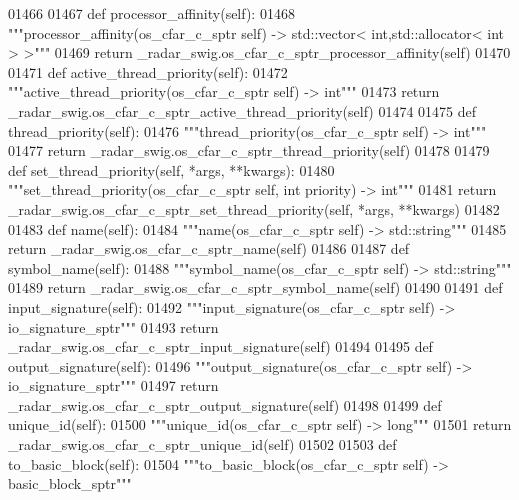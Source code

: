 \begin{DoxyCode}
{{{{{{01466 
01467     \textcolor{keyword}{def }processor_affinity(self):
01468         \textcolor{stringliteral}{"""processor\_affinity(os\_cfar\_c\_sptr self) -> std::vector< int,std::allocator< int > >"""}
01469         \textcolor{keywordflow}{return} \_radar\_swig.os\_cfar\_c\_sptr\_processor\_affinity(self)
01470 
01471     \textcolor{keyword}{def }active_thread_priority(self):
01472         \textcolor{stringliteral}{"""active\_thread\_priority(os\_cfar\_c\_sptr self) -> int"""}
01473         \textcolor{keywordflow}{return} \_radar\_swig.os\_cfar\_c\_sptr\_active\_thread\_priority(self)
01474 
01475     \textcolor{keyword}{def }thread_priority(self):
01476         \textcolor{stringliteral}{"""thread\_priority(os\_cfar\_c\_sptr self) -> int"""}
01477         \textcolor{keywordflow}{return} \_radar\_swig.os\_cfar\_c\_sptr\_thread\_priority(self)
01478 
01479     \textcolor{keyword}{def }set_thread_priority(self, *args, **kwargs):
01480         \textcolor{stringliteral}{"""set\_thread\_priority(os\_cfar\_c\_sptr self, int priority) -> int"""}
01481         \textcolor{keywordflow}{return} \_radar\_swig.os\_cfar\_c\_sptr\_set\_thread\_priority(self, *args, **kwargs)
01482 
01483     \textcolor{keyword}{def }name(self):
01484         \textcolor{stringliteral}{"""name(os\_cfar\_c\_sptr self) -> std::string"""}
01485         \textcolor{keywordflow}{return} \_radar\_swig.os\_cfar\_c\_sptr\_name(self)
01486 
01487     \textcolor{keyword}{def }symbol_name(self):
01488         \textcolor{stringliteral}{"""symbol\_name(os\_cfar\_c\_sptr self) -> std::string"""}
01489         \textcolor{keywordflow}{return} \_radar\_swig.os\_cfar\_c\_sptr\_symbol\_name(self)
01490 
01491     \textcolor{keyword}{def }input_signature(self):
01492         \textcolor{stringliteral}{"""input\_signature(os\_cfar\_c\_sptr self) -> io\_signature\_sptr"""}
01493         \textcolor{keywordflow}{return} \_radar\_swig.os\_cfar\_c\_sptr\_input\_signature(self)
01494 
01495     \textcolor{keyword}{def }output_signature(self):
01496         \textcolor{stringliteral}{"""output\_signature(os\_cfar\_c\_sptr self) -> io\_signature\_sptr"""}
01497         \textcolor{keywordflow}{return} \_radar\_swig.os\_cfar\_c\_sptr\_output\_signature(self)
01498 
01499     \textcolor{keyword}{def }unique_id(self):
01500         \textcolor{stringliteral}{"""unique\_id(os\_cfar\_c\_sptr self) -> long"""}
01501         \textcolor{keywordflow}{return} \_radar\_swig.os\_cfar\_c\_sptr\_unique\_id(self)
01502 
01503     \textcolor{keyword}{def }to_basic_block(self):
01504         \textcolor{stringliteral}{"""to\_basic\_block(os\_cfar\_c\_sptr self) -> basic\_block\_sptr"""}
}}}}}}
\end{DoxyCode}

